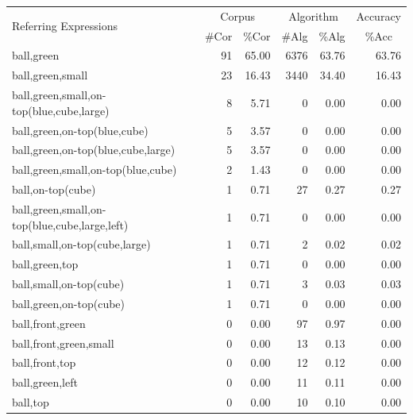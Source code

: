 \begin{table}[h!]
\begin{center}
\begin{tabular}{|l|r|r|r|r|r|}
\hline
\multirow{2}{*}{Referring Expressions} & \multicolumn{2}{|c|}{Corpus} & \multicolumn{2}{|c|}{Algorithm} & Accuracy \\ \cline{2-6} 
 & \#Cor & \multicolumn{1}{|c|}{\%Cor} & \multicolumn{1}{|c|}{\#Alg} & \multicolumn{1}{|c|}{\%Alg} & \multicolumn{1}{|c|}{\%Acc} \\
\hline
ball,green                                    & 91 & 65.00 & 6376 & 63.76 & 63.76 \\
ball,green,small                              & 23 & 16.43 & 3440 & 34.40 & 16.43 \\
ball,green,small,on-top(blue,cube,large)      &  8 &  5.71 &    0 &  0.00 &  0.00\\
ball,green,on-top(blue,cube)                  &  5 &  3.57 &    0 &  0.00 &  0.00\\
ball,green,on-top(blue,cube,large)            &  5 &  3.57 &    0 &  0.00 &  0.00\\
ball,green,small,on-top(blue,cube)            &  2 &  1.43 &    0 &  0.00 &  0.00\\
ball,on-top(cube)                             &  1 &  0.71 &   27 &  0.27 &  0.27 \\
ball,green,small,on-top(blue,cube,large,left) &  1 &  0.71 &    0 &  0.00 &  0.00\\
ball,small,on-top(cube,large)	              &  1 &  0.71 &    2 &  0.02 &  0.02 \\
ball,green,top                                &  1 &  0.71 &    0 &  0.00 &  0.00\\
ball,small,on-top(cube)                       &  1 &  0.71 &    3 &  0.03 &  0.03 \\
ball,green,on-top(cube)                       &  1 &  0.71 &    0 &  0.00 &  0.00\\
ball,front,green                              &  0 &  0.00 &   97 &  0.97 &  0.00\\
ball,front,green,small                        &  0 &  0.00 &   13 &  0.13 &  0.00\\
ball,front,top                                &  0 &  0.00 &   12 &  0.12 &  0.00\\
ball,green,left	                              &  0 &  0.00 &   11 &  0.11 &  0.00\\
ball,top                                      &  0 &  0.00 &   10 &  0.10 &  0.00\\

\end{tabular}
\end{center}
\end{table}
